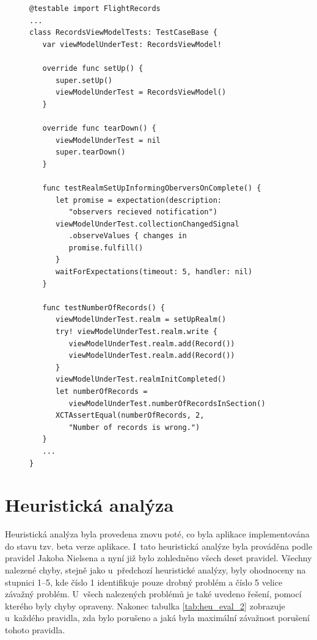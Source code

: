 \documentclass[thesis=M,czech]{FITthesis}[2012/06/26]
\begin{document}
\begin{figure}
\begin{minipage}{\linewidth}
\begin{lstlisting}[caption={Ukázka unit testů},label={lst:unitTests}]
@testable import FlightRecords
...
class RecordsViewModelTests: TestCaseBase {
   var viewModelUnderTest: RecordsViewModel!
    
   override func setUp() {
      super.setUp()
      viewModelUnderTest = RecordsViewModel()
   }
    
   override func tearDown() {
      viewModelUnderTest = nil
      super.tearDown()
   }

   func testRealmSetUpInformingOberversOnComplete() {
      let promise = expectation(description: 
         "observers recieved notification") 
      viewModelUnderTest.collectionChangedSignal
         .observeValues { changes in
         promise.fulfill()
      } 
      waitForExpectations(timeout: 5, handler: nil)
   }

   func testNumberOfRecords() {
      viewModelUnderTest.realm = setUpRealm()
      try! viewModelUnderTest.realm.write {
         viewModelUnderTest.realm.add(Record())
         viewModelUnderTest.realm.add(Record())
      }
      viewModelUnderTest.realmInitCompleted() 
      let numberOfRecords = 
         viewModelUnderTest.numberOfRecordsInSection()  
      XCTAssertEqual(numberOfRecords, 2, 
         "Number of records is wrong.")
   }
   ...
}
\end{lstlisting}
\end{minipage}
\end{figure}
	
\section{Heuristická analýza}
Heuristická analýza byla provedena znovu poté, co byla aplikace implementována do stavu tzv. beta verze aplikace. I~tato heuristická analýze byla prováděna podle pravidel Jakoba Nielsena a nyní již bylo zohledněno všech deset pravidel. Všechny nalezené chyby, stejně jako u~předchozí heuristické analýzy, byly ohodnoceny na stupnici 1--5, kde číslo 1 identifikuje pouze drobný problém a číslo 5 velice závažný problém. U~všech nalezených problémů je také uvedeno řešení, pomocí kterého byly chyby opraveny. Nakonec tabulka \ref{tab:heu_eval_2} zobrazuje u~každého pravidla, zda bylo porušeno a jaká byla maximální závažnost porušení tohoto pravidla.
\end{document}
